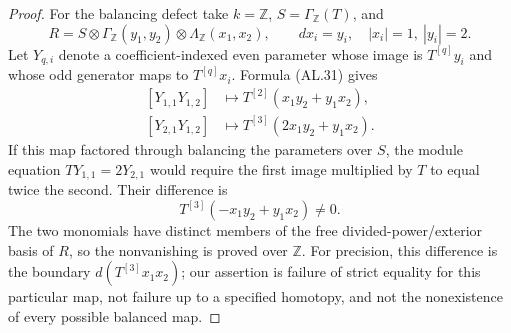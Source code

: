 \begin{proof}
For the balancing defect take
$k=\mathbb Z$, $S=\Gamma_{\mathbb Z}(T)$, and
\[
 R=S\otimes\Gamma_{\mathbb Z}(y_1,y_2)
          \otimes\Lambda_{\mathbb Z}(x_1,x_2),
 \qquad dx_i=y_i,\quad |x_i|=1,\ |y_i|=2.
\]
Let $Y_{q,i}$ denote a coefficient-indexed even
parameter whose image is $T^{[q]}y_i$ and whose
odd generator maps to $T^{[q]}x_i$.
Formula \textup{(AL.31)} gives
\[
 \begin{aligned}
 [Y_{1,1}Y_{1,2}]&\longmapsto
       T^{[2]}(x_1y_2+y_1x_2),\\
 [Y_{2,1}Y_{1,2}]&\longmapsto
       T^{[3]}(2x_1y_2+y_1x_2).
 \end{aligned}                                                   \tag{AL.34}
\]
If this map factored through balancing the parameters
over $S$, the module equation
$T Y_{1,1}=2Y_{2,1}$ would require the first image
multiplied by $T$ to equal twice the second.
Their difference is
\[
       T^{[3]}(-x_1y_2+y_1x_2)\ne0.                 \tag{AL.35}
\]
The two monomials have distinct members of the free
divided-power/exterior basis of $R$, so the
nonvanishing is proved over $\mathbb Z$.
For precision, this difference is the boundary
$d(T^{[3]}x_1x_2)$; our assertion is failure of
strict equality for this particular map, not
failure up to a specified homotopy, and not the
nonexistence of every possible balanced map.
\end{proof}

